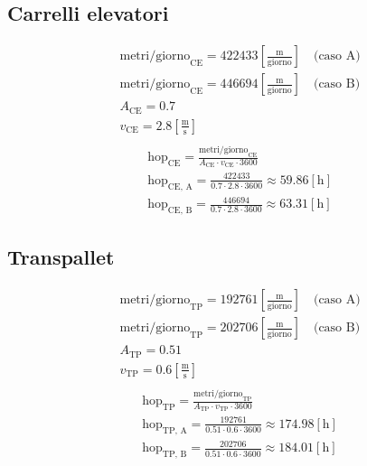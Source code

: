 \documentclass[a4paper,12pt]{article}
\begin{document}
\subsection{Carrelli elevatori}
\begin{align*}
  &\text{metri/giorno}_{\text{CE}} = 422433 \left[\frac{\mathrm{m}}{\mathrm{giorno}}\right] \quad \text{(caso A)} \\
  &\text{metri/giorno}_{\text{CE}} = 446694 \left[\frac{\mathrm{m}}{\mathrm{giorno}}\right] \quad \text{(caso B)} \\
  &A_{\text{CE}} = 0.7 \\
  &v_{\text{CE}} = 2.8 \left[\frac{\mathrm{m}}{\mathrm{s}}\right] \\
\end{align*}
\begin{align*}
  &\text{hop}_{\text{CE}} = \frac{\text{metri/giorno}_{\text{CE}}}{A_{\text{CE}} \cdot v_{\text{CE}} \cdot 3600} \\
  &\text{hop}_{\text{CE, A}} = \frac{422433}{0.7 \cdot 2.8 \cdot 3600} \approx 59.86 \left[\mathrm{h}\right] \\
  &\text{hop}_{\text{CE, B}} = \frac{446694}{0.7 \cdot 2.8 \cdot 3600} \approx 63.31 \left[\mathrm{h}\right]
\end{align*}
\subsection{Transpallet}
\begin{align*}
  &\text{metri/giorno}_{\text{TP}} = 192761 \left[\frac{\mathrm{m}}{\mathrm{giorno}}\right] \quad \text{(caso A)} \\
  &\text{metri/giorno}_{\text{TP}} = 202706 \left[\frac{\mathrm{m}}{\mathrm{giorno}}\right] \quad \text{(caso B)} \\
  &A_{\text{TP}} = 0.51 \\
  &v_{\text{TP}} = 0.6 \left[\frac{\mathrm{m}}{\mathrm{s}}\right] \\
\end{align*}
\begin{align*}
  &\text{hop}_{\text{TP}} = \frac{\text{metri/giorno}_{\text{TP}}}{A_{\text{TP}} \cdot v_{\text{TP}} \cdot 3600} \\
  &\text{hop}_{\text{TP, A}} = \frac{192761}{0.51 \cdot 0.6 \cdot 3600} \approx 174.98 \left[\mathrm{h}\right] \\
  &\text{hop}_{\text{TP, B}} = \frac{202706}{0.51 \cdot 0.6 \cdot 3600} \approx 184.01 \left[\mathrm{h}\right]
\end{align*}
\end{document}
